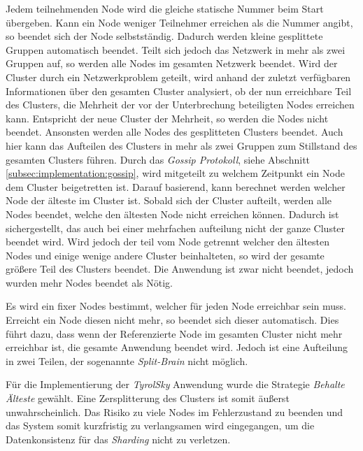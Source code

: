 \begin{itemize}
    Jedem teilnehmenden Node wird die gleiche statische Nummer beim Start übergeben. Kann ein Node weniger Teilnehmer erreichen als die Nummer angibt, so beendet sich der Node selbstständig. Dadurch werden kleine gesplittete Gruppen automatisch beendet. Teilt sich jedoch das Netzwerk in mehr als zwei Gruppen auf, so werden alle Nodes im gesamten Netzwerk beendet. 
    Wird der Cluster durch ein Netzwerkproblem geteilt, wird anhand der zuletzt verfügbaren Informationen über den gesamten Cluster analysiert, ob der nun erreichbare Teil des Clusters, die Mehrheit der vor der Unterbrechung  beteiligten Nodes  erreichen kann. Entspricht der neue Cluster der Mehrheit, so werden die Nodes nicht beendet. Ansonsten werden alle Nodes des gesplitteten Clusters beendet. Auch hier kann das Aufteilen des Clusters in mehr als zwei Gruppen zum Stillstand des gesamten Clusters führen.
    Durch das \textit{Gossip Protokoll}, siehe Abschnitt \ref{subsec:implementation:gossip}, wird  mitgeteilt zu welchem Zeitpunkt ein Node dem Cluster beigetretten ist. Darauf basierend, kann berechnet werden welcher Node der älteste im Cluster ist. Sobald sich der Cluster aufteilt, werden alle Nodes beendet, welche den ältesten Node nicht erreichen können. Dadurch ist sichergestellt, das auch bei einer mehrfachen aufteilung nicht der ganze Cluster beendet wird. Wird jedoch der teil vom Node getrennt welcher den ältesten Nodes und einige wenige andere Cluster beinhalteten, so wird der gesamte größere Teil des Clusters beendet. Die Anwendung ist zwar nicht beendet, jedoch wurden mehr Nodes beendet als Nötig. 

    Es wird ein fixer Nodes bestimmt, welcher für jeden Node erreichbar sein muss. Erreicht ein Node diesen nicht mehr, so beendet sich dieser automatisch. Dies führt dazu, dass wenn der Referenzierte Node im gesamten Cluster nicht mehr erreichbar ist, die gesamte Anwendung beendet wird. Jedoch ist eine Aufteilung in zwei Teilen, der sogenannte \textit{Split-Brain} nicht möglich.
\end{itemize}
Für die Implementierung der \textit{TyrolSky} Anwendung wurde die Strategie \textit{Behalte Älteste} gewählt. Eine Zersplitterung des Clusters ist somit äußerst unwahrscheinlich. Das Risiko zu viele Nodes im Fehlerzustand zu beenden und das System somit kurzfristig zu verlangsamen wird eingegangen, um die Datenkonsistenz für das \textit{Sharding} nicht zu verletzen.   


